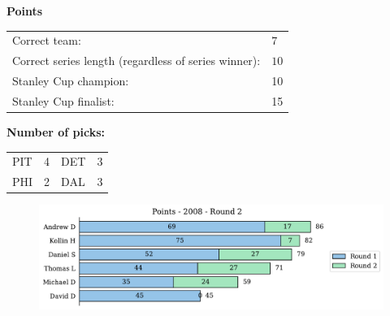 \documentclass[10pt]{article}
\begin{document}
{\bf Points}\\
\begin{minipage}{12cm}
    \begin{tabular}{l l}
        Correct team:	& $7$\\
        Correct series length (regardless of series winner):	& $10$\\
        Stanley Cup champion:	& 10\\
        Stanley Cup finalist:	& 15\\
    \end{tabular}

    \vspace{0.5cm}
    {\bf Number of picks:}\\
    \begin{tabular}{lc | lc }
        PIT & 4 & DET & 3 \\
        PHI & 2 & DAL & 3 \\
    \end{tabular}
\end{minipage}
\begin{minipage}[t]{13cm}
    \begin{figure}[H]
        \vspace{-3.5cm}
        \includegraphics[width=12cm]{../../figures/2008/Points-2008-Round2.pdf}
    \end{figure}
\end{minipage}
\end{document}

